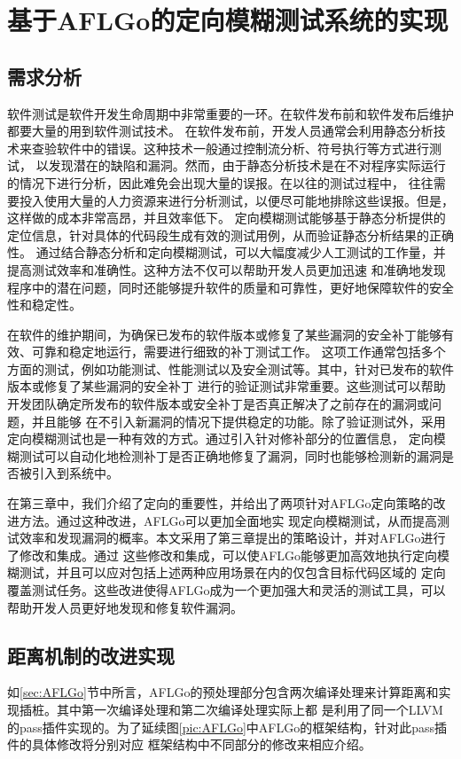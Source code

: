 \documentclass[bachelor]{njupthesis}
\begin{document}
\chapter{基于AFLGo的定向模糊测试系统的实现}
\section{需求分析}
软件测试是软件开发生命周期中非常重要的一环。在软件发布前和软件发布后维护都要大量的用到软件测试技术。
在软件发布前，开发人员通常会利用静态分析技术来查验软件中的错误。这种技术一般通过控制流分析、符号执行等方式进行测试，
以发现潜在的缺陷和漏洞。然而，由于静态分析技术是在不对程序实际运行的情况下进行分析，因此难免会出现大量的误报。在以往的测试过程中，
往往需要投入使用大量的人力资源来进行分析测试，以便尽可能地排除这些误报。但是，这样做的成本非常高昂，并且效率低下。
定向模糊测试能够基于静态分析提供的定位信息，针对具体的代码段生成有效的测试用例，从而验证静态分析结果的正确性。
通过结合静态分析和定向模糊测试，可以大幅度减少人工测试的工作量，并提高测试效率和准确性。这种方法不仅可以帮助开发人员更加迅速
和准确地发现程序中的潜在问题，同时还能够提升软件的质量和可靠性，更好地保障软件的安全性和稳定性。

在软件的维护期间，为确保已发布的软件版本或修复了某些漏洞的安全补丁能够有效、可靠和稳定地运行，需要进行细致的补丁测试工作。
这项工作通常包括多个方面的测试，例如功能测试、性能测试以及安全测试等。其中，针对已发布的软件版本或修复了某些漏洞的安全补丁
进行的验证测试非常重要。这些测试可以帮助开发团队确定所发布的软件版本或安全补丁是否真正解决了之前存在的漏洞或问题，并且能够
在不引入新漏洞的情况下提供稳定的功能。除了验证测试外，采用定向模糊测试也是一种有效的方式。通过引入针对修补部分的位置信息，
定向模糊测试可以自动化地检测补丁是否正确地修复了漏洞，同时也能够检测新的漏洞是否被引入到系统中。

在第三章中，我们介绍了定向的重要性，并给出了两项针对AFLGo定向策略的改进方法。通过这种改进，AFLGo可以更加全面地实
现定向模糊测试，从而提高测试效率和发现漏洞的概率。本文采用了第三章提出的策略设计，并对AFLGo进行了修改和集成。通过
这些修改和集成，可以使AFLGo能够更加高效地执行定向模糊测试，并且可以应对包括上述两种应用场景在内的仅包含目标代码区域的
定向覆盖测试任务。这些改进使得AFLGo成为一个更加强大和灵活的测试工具，可以帮助开发人员更好地发现和修复软件漏洞。

\section{距离机制的改进实现}
如\ref{sec:AFLGo}节中所言，AFLGo的预处理部分包含两次编译处理来计算距离和实现插桩。其中第一次编译处理和第二次编译处理实际上都
是利用了同一个LLVM的pass插件\cite{Pass}实现的。为了延续图\ref{pic:AFLGo}中AFLGo的框架结构，针对此pass插件的具体修改将分别对应
框架结构中不同部分的修改来相应介绍。
\end{document}
